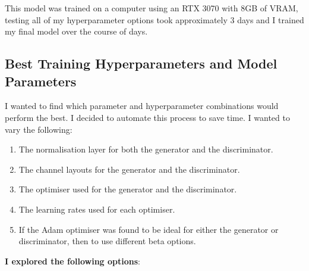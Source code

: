 \documentclass[11pt]{article}
\begin{document}


This model was trained on a computer using an RTX 3070 with 8GB of VRAM, testing all of my hyperparameter options took approximately 3 days and I trained my final model over the course of 
days.

\subsection{Best Training Hyperparameters and Model Parameters}

I wanted to find which parameter and hyperparameter combinations would perform the best. I decided to automate this process to save time. I wanted to vary the following:
\begin{enumerate}
\item The normalisation layer for both the generator and the discriminator.
\item The channel layouts for the generator and the discriminator.
\item The optimiser used for the generator and the discriminator.
\item The learning rates used for each optimiser.
\item If the Adam optimiser was found to be ideal for either the generator or discriminator, then to use different beta options.
\end{enumerate}

\textbf{I explored the following options}:
\end{document}
